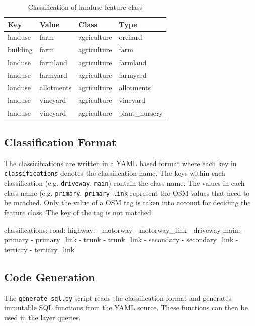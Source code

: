 \begin{table}[H]
\centering
    \begin{tabular}{llll}
    Key      & Value      & Class       & Type           \\
    \hline
    landuse  & farm       & agriculture & orchard        \\
    building & farm       & agriculture & farm           \\
    landuse  & farmland   & agriculture & farmland       \\
    landuse  & farmyard   & agriculture & farmyard       \\
    landuse  & allotments & agriculture & allotments     \\
    landuse  & vineyard   & agriculture & vineyard       \\
    landuse  & vineyard   & agriculture & plant\_nursery
    \end{tabular}
    \caption{Classification of landuse feature class}
\end{table}

\subsection{Classification Format}

The classicifcations are written in a YAML based format
where each key in \texttt{classifications} denotes the classification name.
The keys within each classification (e.g. \texttt{driveway}, \texttt{main}) contain the class name.
The values in each class name (e.g. \texttt{primary}, \texttt{primary\_link} represent the OSM values that need to be matched.
Only the value of a OSM tag is taken into account for deciding the feature class. The key
of the tag is not matched.

\begin{yamlcode}
classifications:
  road:
    highway:
    - motorway
    - motorway_link
    - driveway
    main:
    - primary
    - primary_link
    - trunk
    - trunk_link
    - secondary
    - secondary_link
    - tertiary
    - tertiary_link
\end{yamlcode}
\newpage

\subsection{Code Generation}

The \texttt{generate\_sql.py} script reads the classification format and generates
immutable SQL functions from the YAML source.
These functions can then be used in the layer queries.

